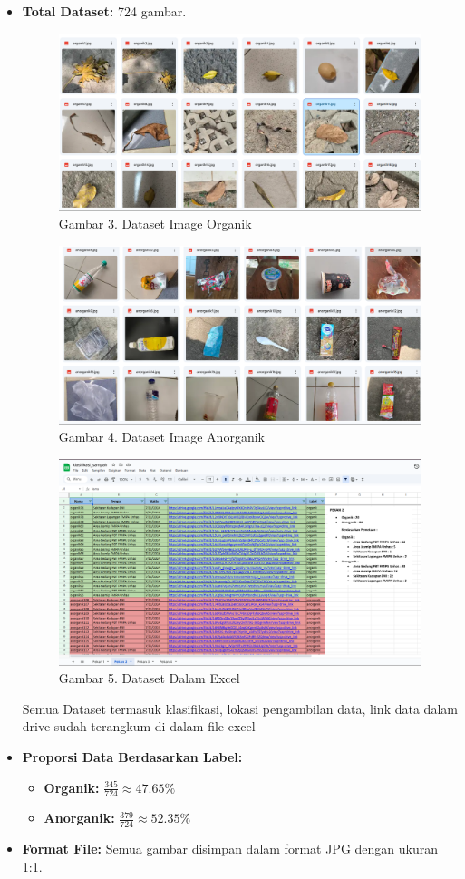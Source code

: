 \documentclass[12pt,a4paper]{article}
\begin{document}
\begin{itemize}
    \item \textbf{Total Dataset:} 724 gambar.
    \begin{figure}[h]
        \centering
        \includegraphics[width=0.6\linewidth]{Images/fotoorganik.png}
        \caption*{Gambar 3. Dataset Image Organik }
        \label{fig:dataset_collection}
    \end{figure}\begin{figure}[h]
        \centering
        \includegraphics[width=0.6\linewidth]{Images/fotoanorganik.png}
        \caption*{Gambar 4. Dataset Image Anorganik}
        \label{fig:dataset_collection}
    \end{figure}

    \begin{figure}[H]
        \centering
        \includegraphics[width=0.6\linewidth]{Images/ss_excel.png}
        \caption*{Gambar 5. Dataset Dalam Excel}
        \label{fig:dataset_collection}
    \end{figure}

    Semua Dataset termasuk klasifikasi, lokasi pengambilan data, link data dalam drive sudah terangkum di dalam file excel
    
    \item \textbf{Proporsi Data Berdasarkan Label:}
    \begin{itemize}
        \item \textbf{Organik:} \(\frac{345}{724} \approx 47.65\%\)
        \item \textbf{Anorganik:} \(\frac{379}{724} \approx 52.35\%\)
    \end{itemize}

    \item \textbf{Format File:} Semua gambar disimpan dalam format JPG dengan ukuran 1:1. 
\end{itemize}
\end{document}
